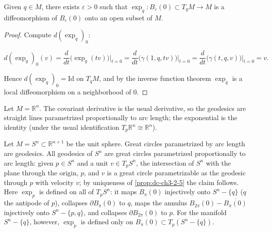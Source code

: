 \begin{proposition}
  \label{prop:dc-ch3-2-9}



  Given $q\in M$, there exists $\varepsilon>0$ such that
  $\exp_q:B_\varepsilon(0)\subset T_qM\to M$ is a diffeomorphism of
  $B_\varepsilon(0)$ onto an open subset of $M$.
\end{proposition}
\begin{proof}
  \sketch
  Compute $d(\exp_q)_0$:

  $$
  d(\exp_q)_0(v)=\frac{d}{dt}\big(\exp_q(tv)\big)\Big|_{t=0}=\frac{d}{dt}\big(\gamma(1,q,tv)\big)\Big|_{t=0}=\frac{d}{dt}\big(\gamma(t,q,v)\big)\Big|_{t=0}=v.
  $$

  Hence $d(\exp_q)_0=\mathrm{Id}$ on $T_qM$, and by the inverse function theorem
  $\exp_q$ is a local diffeomorphism on a neighborhood of $0$.
\end{proof}

\begin{example}
  \label{ex:dc-ch3-2-10}



  Let $M=\mathbb{R}^n$. The covariant derivative is the usual derivative, so the
  geodesics are straight lines parametrized proportionally to arc length; the
  exponential is the identity (under the usual identification $T_p\mathbb{R}^n\cong\mathbb{R}^n$).
\end{example}

\begin{example}
  \label{ex:dc-ch3-2-11}


  Let $M=S^n\subset\mathbb{R}^{n+1}$ be the unit sphere. Great circles
  parametrized by arc length are geodesics. All
  geodesics of $S^n$ are great circles parametrized proportionally to arc length:
  given $p\in S^n$ and a unit $v\in T_pS^n$, the intersection of $S^n$ with the
  plane through the origin, $p$, and $v$ is a great circle parametrizable as the
  geodesic through $p$ with velocity $v$; by uniqueness of \cref{prop:dc-ch3-2-5} the claim
  follows. Here $\exp_p$ is defined on all of $T_p S^n$: it maps $B_\pi(0)$
  injectively onto $S^n-\{q\}$ ($q$ the antipode of $p$), collapses
  $\partial B_\pi(0)$ to $q$, maps the annulus $B_{2\pi}(0)-\overline{B_\pi(0)}$
  injectively onto $S^n-\{p,q\}$, and collapses $\partial B_{2\pi}(0)$ to $p$.
  For the manifold $S^n-\{q\}$, however, $\exp_p$ is defined only on
  $B_\pi(0)\subset T_p(S^n-\{q\})$.
\end{example}

